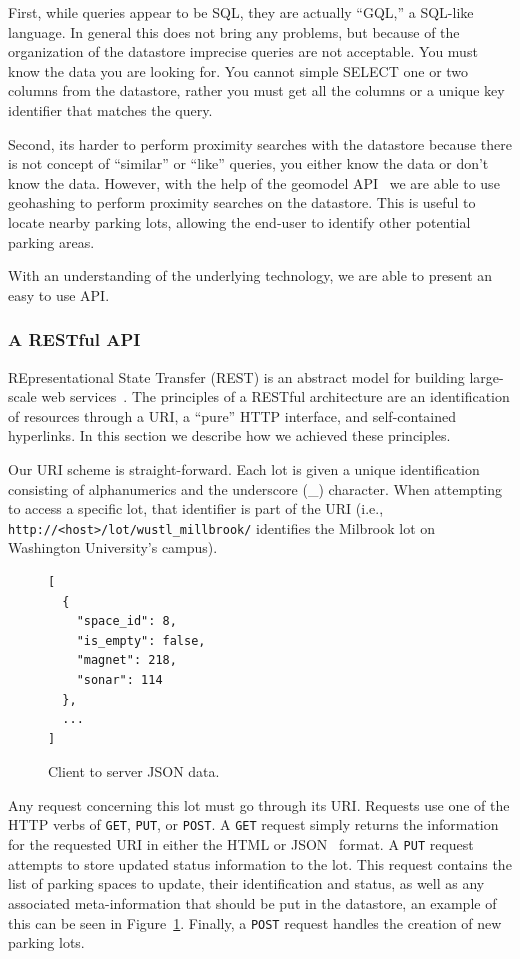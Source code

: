 \documentclass{acm_proc}
\begin{document}
First, while queries appear to be SQL, they are actually ``GQL,'' a
SQL-like language.
In general this does not bring any problems, but because of the
organization of the datastore imprecise queries are not acceptable.
You must know the data you are looking for.
You cannot simple SELECT one or two columns from the datastore, rather you
must get all the columns or a unique key identifier that matches the query.

Second, its harder to perform proximity searches with the datastore because
there is not concept of ``similar'' or ``like'' queries, you either know
the data or don't know the data.
However, with the help of the geomodel API~\cite{geomodel} we are able to
use geohashing to perform proximity searches on the datastore.
This is useful to locate nearby parking lots, allowing the end-user to
identify other potential parking areas.

With an understanding of the underlying technology, we are able to present
an easy to use API.

\subsubsection{A RESTful API}

REpresentational State Transfer (REST) is an abstract model for building
large-scale web services~\cite{pautasso:restful}.
The principles of a RESTful architecture are an identification of resources
through a URI, a ``pure'' HTTP interface, and self-contained hyperlinks.
In this section we describe how we achieved these principles.

Our URI scheme is straight-forward.
Each lot is given a unique identification consisting of alphanumerics and
the underscore (\_) character.
When attempting to access a specific lot, that identifier is part of the
URI (i.e.,
\texttt{http://<host>/lot/wustl\_millbrook/}
identifies the Milbrook lot on Washington University's campus).

\begin{figure}
    \begin{verbatim}
[
  {
    "space_id": 8,
    "is_empty": false,
    "magnet": 218,
    "sonar": 114
  },
  ...
]
\end{verbatim}
	\caption{Client to server JSON data.}
	\label{fig:clientserverjson}
\end{figure}

Any request concerning this lot must go through its URI.
Requests use one of the HTTP verbs of \texttt{GET}, \texttt{PUT}, or
\texttt{POST}.
A \texttt{GET} request simply returns the information for the requested URI
in either the HTML or JSON~\cite{crockford:json} format.
A \texttt{PUT} request attempts to store updated status information to the
lot.
This request contains the list of parking spaces to update, their
identification and status, as well as any associated meta-information that
should be put in the datastore, an example of this can be seen in
Figure~\ref{fig:clientserverjson}.
Finally, a \texttt{POST} request handles the creation of new parking lots.
\end{document}
